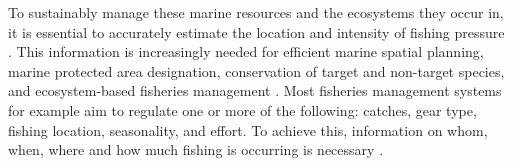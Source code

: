 \medskip

To sustainably manage these marine resources and the ecosystems they occur in, it is essential to
accurately estimate the location and intensity of fishing pressure
\citep{piet_fishing_indicators,russo_indicators,fishing_grounds_greece}. This information is
increasingly needed for efficient marine spatial planning, marine protected area designation,
conservation of target and non-target species, and ecosystem-based fisheries management
\citep{vespe_map_2016,henrique_effort_estimation,tidd_importance_effort,gerritsen2010,ais_mpa_designation,ais_bycatch,ais_bird_bycatch}.
Most fisheries management systems for example aim to regulate one or more of the following:
catches, gear type, fishing location, seasonality, and effort. To achieve this, information on
whom, when, where and how much fishing is occurring is necessary \citep{orofino_transparency}.

\medskip

